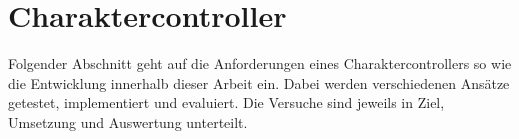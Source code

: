 \chapter{Charaktercontroller}
\label{sec:charaktercontroller}
Folgender Abschnitt geht auf die Anforderungen eines Charaktercontrollers so wie die Entwicklung innerhalb dieser Arbeit ein. Dabei werden verschiedenen Ansätze getestet, implementiert und evaluiert. Die Versuche sind jeweils in Ziel, Umsetzung und Auswertung unterteilt.



